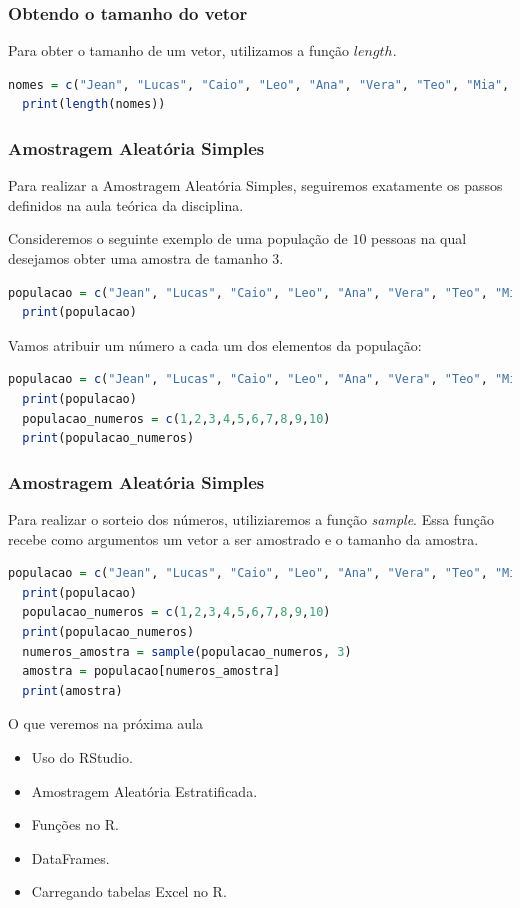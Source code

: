 \documentclass{beamer}
\begin{document}
\begin{frame}[fragile]
    \frametitle{Obtendo o tamanho do vetor}
    Para obter o tamanho de um vetor, utilizamos a função $length$.
  \begin{lstlisting}[language=R]
  nomes = c("Jean", "Lucas", "Caio", "Leo", "Ana", "Vera", "Teo", "Mia", "Ina", "Isa")
  print(length(nomes))
  \end{lstlisting}
\end{frame}

\begin{frame}[fragile]
\frametitle{Amostragem Aleatória Simples}
  Para realizar a Amostragem Aleatória Simples, seguiremos exatamente os passos definidos na aula teórica da disciplina. 

Consideremos o seguinte exemplo de uma população de $10$ pessoas na qual desejamos obter uma amostra de tamanho $3$.
  \begin{lstlisting}[language=R]
  populacao = c("Jean", "Lucas", "Caio", "Leo", "Ana", "Vera", "Teo", "Mia", "Ina", "Isa")
  print(populacao)
  \end{lstlisting}

Vamos atribuir um número a cada um dos elementos da população:
\begin{lstlisting}[language=R]
  populacao = c("Jean", "Lucas", "Caio", "Leo", "Ana", "Vera", "Teo", "Mia", "Ina", "Isa")
  print(populacao)
  populacao_numeros = c(1,2,3,4,5,6,7,8,9,10)
  print(populacao_numeros)
  \end{lstlisting}
\end{frame}

\begin{frame}[fragile]
 \frametitle{Amostragem Aleatória Simples}
 
 Para realizar o sorteio dos números, utiliziaremos a função \textit{sample}. Essa função recebe como argumentos um vetor a ser amostrado e o tamanho da amostra. 
\begin{lstlisting}[language=R]
  populacao = c("Jean", "Lucas", "Caio", "Leo", "Ana", "Vera", "Teo", "Mia", "Ina", "Isa")
  print(populacao)
  populacao_numeros = c(1,2,3,4,5,6,7,8,9,10)
  print(populacao_numeros)
  numeros_amostra = sample(populacao_numeros, 3)
  amostra = populacao[numeros_amostra]
  print(amostra)
  \end{lstlisting}
\end{frame}

\begin{frame}{O que veremos na próxima aula}
  \begin{itemize}
    \item Uso do RStudio.
    \item Amostragem Aleatória Estratificada.
    \item Funções no R. 
    \item DataFrames.
    \item Carregando tabelas Excel no R. 
  \end{itemize}
\end{frame}
\end{document}
